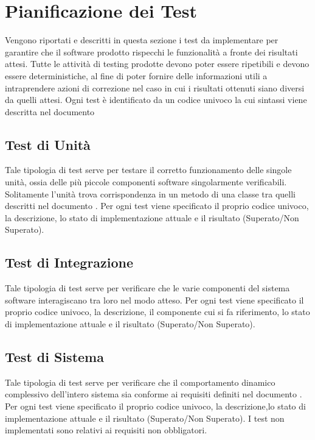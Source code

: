 {\section{Pianificazione dei Test}

Vengono riportati e descritti in questa sezione i test da implementare per garantire che il
software prodotto rispecchi le funzionalità a fronte dei risultati attesi. 
Tutte le attività di testing prodotte devono poter essere ripetibili e
devono essere deterministiche, al fine di poter fornire delle
informazioni utili a intraprendere azioni di correzione nel caso in
cui i risultati ottenuti siano diversi da quelli attesi. 
Ogni test è identificato da un codice univoco la cui sintassi viene descritta nel documento \normediprogetto

\subsection{Test di Unità}

Tale tipologia di test serve per testare il corretto funzionamento
delle singole unità, ossia delle più piccole componenti software
singolarmente verificabili. Solitamente l'unità trova corrispondenza
in un metodo di una classe tra quelli descritti nel documento
. Per ogni test viene specificato il proprio
codice univoco, la descrizione, lo stato di implementazione attuale e
il risultato (Superato/Non Superato). 



\subsection{Test di Integrazione}

Tale tipologia di test serve per verificare che le varie componenti
del sistema software interagiscano tra loro nel modo atteso. Per ogni
test viene specificato il proprio codice univoco, la descrizione, il
componente cui si fa riferimento, lo stato di implementazione attuale
e il risultato (Superato/Non Superato). 



\subsection{Test di Sistema}

Tale tipologia di test serve per verificare che il comportamento
dinamico complessivo dell'intero sistema sia conforme ai requisiti
definiti nel documento \analisideirequisiti. Per ogni test viene
specificato il proprio codice univoco, la descrizione,lo stato di
implementazione attuale e il risultato (Superato/Non Superato).
I test non implementati sono relativi ai requisiti non obbligatori. 

}
